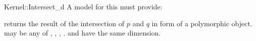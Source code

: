 \begin{ccRefFunctionObjectConcept}{Kernel::Intersect_d}
A model for this must provide:


{returns the result of the intersection of $p$ and $q$ in form of a
  polymorphic object.  may be any of
  , , ,
  .  \ccPrecond {} and  have the
  same dimension.}

\end{ccRefFunctionObjectConcept}
